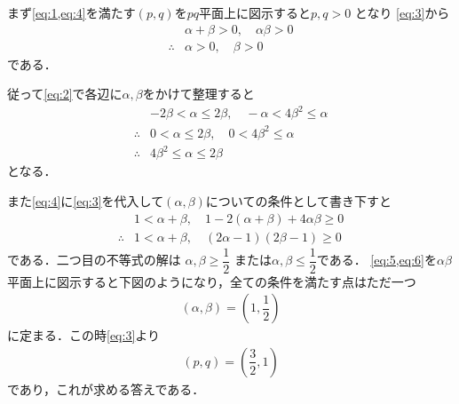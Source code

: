 \documentclass[../../main.tex]{subfiles}
\begin{document}
まず\cref{eq:1,eq:4}を満たす$(p,q)$を$pq$平面上に図示すると$p, q > 0$ となり
\cref{eq:3}から
\begin{align}
  & \alpha + \beta > 0, \quad \alpha\beta > 0 \\
  \therefore
  & \alpha >0, \quad \beta >0
\end{align}
である．

従って\cref{eq:2}で各辺に$\alpha, \beta$をかけて整理すると
\begin{align}
  &-2\beta < \alpha \le 2\beta, \quad -\alpha < 4\beta^2 \le \alpha \\
  \therefore
  &0 < \alpha \le 2\beta, \quad 0 < 4\beta^2 \le \alpha \\
  \therefore
  &4\beta^2 \le \alpha \le 2\beta \label{eq:5}
\end{align}
となる．

また\cref{eq:4}に\cref{eq:3}を代入して$(\alpha,\beta)$についての条件として書き下すと
\begin{align}
  & 1 < \alpha + \beta, \quad 1 - 2(\alpha+\beta) + 4\alpha\beta \ge 0 \\
  \therefore
  & 1 < \alpha + \beta, \quad \left(2\alpha-1\right)\left(2\beta-1\right) \ge 0 \label{eq:6}
\end{align}
である．二つ目の不等式の解は $\alpha, \beta \ge \dfrac{1}{2}$ または$\alpha, \beta \le \dfrac{1}{2}$である．
\cref{eq:5,eq:6}を$\alpha\beta$平面上に図示すると下図のようになり，全ての条件を満たす点はただ一つ
\begin{align}
  (\alpha, \beta) = \left(1, \dfrac{1}{2}\right)
\end{align}
に定まる．この時\cref{eq:3}より
\begin{align}
  (p, q) = \left(\dfrac{3}{2}, 1\right)
\end{align}
であり，これが求める答えである．
\end{document}

